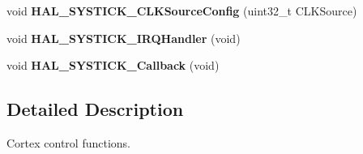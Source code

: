 \begin{DoxyCompactItemize}
\mbox{\label{group___c_o_r_t_e_x___exported___functions___group2_ga3284dc8428996f5b6aa6b3b99e643788}} 
void {\bfseries H\+A\+L\+\_\+\+S\+Y\+S\+T\+I\+C\+K\+\_\+\+C\+L\+K\+Source\+Config} (uint32\+\_\+t C\+L\+K\+Source)
\item 
\mbox{\label{group___c_o_r_t_e_x___exported___functions___group2_ga5b66b62383261c1e0acef98d344aa4c1}} 
void {\bfseries H\+A\+L\+\_\+\+S\+Y\+S\+T\+I\+C\+K\+\_\+\+I\+R\+Q\+Handler} (void)
\item 
\mbox{\label{group___c_o_r_t_e_x___exported___functions___group2_ga5033855e81ba2071231b60599a3ce9a1}} 
void {\bfseries H\+A\+L\+\_\+\+S\+Y\+S\+T\+I\+C\+K\+\_\+\+Callback} (void)
\end{DoxyCompactItemize}


\subsection{Detailed Description}
Cortex control functions. 

